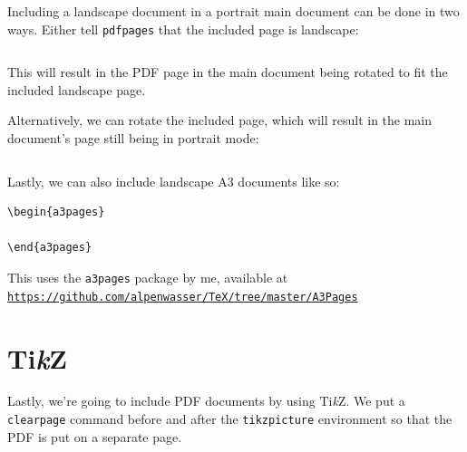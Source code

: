 \documentclass[a4paper,oneside]{article}
\newcommand\code[1]{\texttt{#1}}
\begin{document}


Including a landscape document in a portrait  main document can be done in two
ways.  Either tell \code{pdfpages} that the included page is landscape:

\begin{verbatim}

\end{verbatim}

This will result in the PDF page in the main document being rotated to fit the
included landscape page.



Alternatively, we can rotate the included  page, which will result in the main
document's page still being in portrait mode:

\begin{verbatim}

\end{verbatim}



Lastly, we can also include landscape A3 documents like so:

\begin{verbatim}
\begin{a3pages}
    
\end{a3pages}
\end{verbatim}

This uses the \code{a3pages} package by me, available at 
\href{https://github.com/alpenwasser/TeX/tree/master/A3Pages}
     {\nolinkurl{https://github.com/alpenwasser/TeX/tree/master/A3Pages}}

\begin{a3pages}
    
\end{a3pages}


\clearpage
\section{Ti\emph{k}Z}
\label{sec:tikz}

Lastly, we're  going to include PDF  documents by using Ti\emph{k}Z. We  put a
\code{clearpage} command  before and after the  \code{tikzpicture} environment
so that the PDF is put on a separate page.
\end{document}
